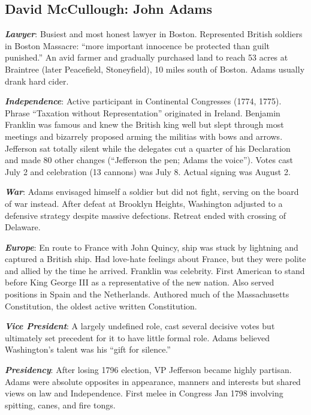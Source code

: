 \documentclass[
]{article}
\begin{document}
\hypertarget{david-mccullough-john-adams}{%
\subsection{David McCullough: John
Adams}\label{david-mccullough-john-adams}}

\textbf{\emph{Lawyer}}: Busiest and most honest lawyer in Boston.
Represented British soldiers in Boston Massacre: ``more important
innocence be protected than guilt punished.'' An avid farmer and
gradually purchased land to reach 53 acres at Braintree (later
Peacefield, Stoneyfield), 10 miles south of Boston. Adams usually drank
hard cider.

\textbf{\emph{Independence}}: Active participant in Continental
Congresses (1774, 1775). Phrase ``Taxation without Representation''
originated in Ireland. Benjamin Franklin was famous and knew the British
king well but slept through most meetings and bizarrely proposed arming
the militias with bows and arrows. Jefferson sat totally silent while
the delegates cut a quarter of his Declaration and made 80 other changes
(``Jefferson the pen; Adams the voice''). Votes cast July 2 and
celebration (13 cannons) was July 8. Actual signing was August 2.

\textbf{\emph{War}}: Adams envisaged himself a soldier but did not
fight, serving on the board of war instead. After defeat at Brooklyn
Heights, Washington adjusted to a defensive strategy despite massive
defections. Retreat ended with crossing of Delaware.

\textbf{\emph{Europe}}: En route to France with John Quincy, ship was
stuck by lightning and captured a British ship. Had love-hate feelings
about France, but they were polite and allied by the time he arrived.
Franklin was celebrity. First American to stand before King George III
as a representative of the new nation. Also served positions in Spain
and the Netherlands. Authored much of the Massachusetts Constitution,
the oldest active written Constitution.

\textbf{\emph{Vice President}}: A largely undefined role, cast several
decisive votes but ultimately set precedent for it to have little formal
role. Adams believed Washington's talent was his ``gift for silence.''

\textbf{\emph{Presidency}}: After losing 1796 election, VP Jefferson
became highly partisan. Adams were absolute opposites in appearance,
manners and interests but shared views on law and Independence. First
melee in Congress Jan 1798 involving spitting, canes, and fire tongs.
\end{document}
